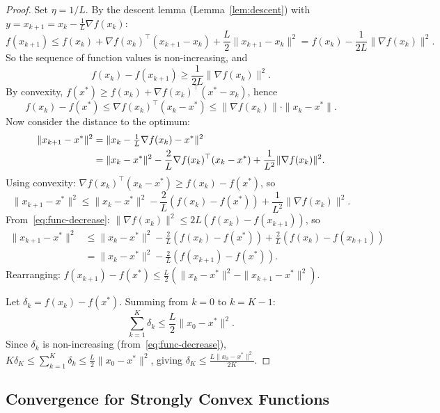 \documentclass[11pt,a4paper]{article}
\theoremstyle{definition}
\theoremstyle{plain}
\theoremstyle{remark}
\begin{document}
\begin{proof}
Set $\eta = 1/L$. By the descent lemma (Lemma~\ref{lem:descent}) with
$y = x_{k+1} = x_k - \frac{1}{L}\nabla f(x_k)$:
\begin{equation}\label{eq:gd-descent-step}
  f(x_{k+1}) \le f(x_k) + \nabla f(x_k)^\top(x_{k+1} - x_k)
    + \frac{L}{2}\|x_{k+1} - x_k\|^2
  = f(x_k) - \frac{1}{2L}\|\nabla f(x_k)\|^2.
\end{equation}
So the sequence of function values is non-increasing, and
\begin{equation}\label{eq:func-decrease}
  f(x_k) - f(x_{k+1}) \ge \frac{1}{2L}\|\nabla f(x_k)\|^2.
\end{equation}
By convexity, $f(x^*) \ge f(x_k) + \nabla f(x_k)^\top(x^* - x_k)$, hence
\begin{equation}\label{eq:convexity-bound}
  f(x_k) - f(x^*) \le \nabla f(x_k)^\top(x_k - x^*) \le \|\nabla f(x_k)\| \cdot \|x_k - x^*\|.
\end{equation}
Now consider the distance to the optimum:
\begin{align}
  \|x_{k+1} - x^*\|^2
  &= \|x_k - \tfrac{1}{L}\nabla f(x_k) - x^*\|^2 \notag \\
  &= \|x_k - x^*\|^2 - \frac{2}{L}\nabla f(x_k)^\top(x_k - x^*)
     + \frac{1}{L^2}\|\nabla f(x_k)\|^2. \label{eq:dist-recursion}
\end{align}
Using convexity: $\nabla f(x_k)^\top(x_k - x^*) \ge f(x_k) - f(x^*)$, so
\[
  \|x_{k+1} - x^*\|^2 \le \|x_k - x^*\|^2
    - \frac{2}{L}(f(x_k) - f(x^*)) + \frac{1}{L^2}\|\nabla f(x_k)\|^2.
\]
From~\eqref{eq:func-decrease}: $\|\nabla f(x_k)\|^2 \le 2L(f(x_k) - f(x_{k+1}))$, so
\begin{align*}
  \|x_{k+1} - x^*\|^2
  &\le \|x_k - x^*\|^2 - \frac{2}{L}(f(x_k) - f(x^*))
    + \frac{2}{L}(f(x_k) - f(x_{k+1})) \\
  &= \|x_k - x^*\|^2 - \frac{2}{L}(f(x_{k+1}) - f(x^*)).
\end{align*}
Rearranging: $f(x_{k+1}) - f(x^*) \le \frac{L}{2}(\|x_k - x^*\|^2 - \|x_{k+1} - x^*\|^2)$.

Let $\delta_k = f(x_k) - f(x^*)$. Summing from $k = 0$ to $k = K-1$:
\[
  \sum_{k=1}^{K} \delta_k \le \frac{L}{2}\|x_0 - x^*\|^2.
\]
Since $\delta_k$ is non-increasing (from~\eqref{eq:func-decrease}),
$K \delta_K \le \sum_{k=1}^K \delta_k \le \frac{L}{2}\|x_0 - x^*\|^2$, giving
$\delta_K \le \frac{L\|x_0 - x^*\|^2}{2K}$.
\end{proof}

\subsection{Convergence for Strongly Convex Functions}
\end{document}
